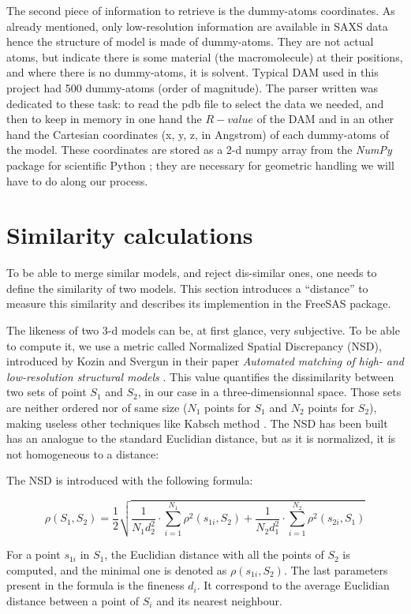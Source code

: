 \documentclass[a4paper, 11pt]{report}
\begin{document}
The second piece of information to retrieve is the dummy-atoms coordinates. 
As already mentioned, only low-resolution information are available in SAXS data 
hence the structure of model is made of dummy-atoms.
They are not actual atoms, but indicate there is 
some material (the macromolecule) at their positions, and where there is
no dummy-atoms, it is solvent. 
Typical DAM used in this project had 500 dummy-atoms (order of magnitude).
The parser written was dedicated to these task: to read the pdb file 
to select the data we needed, and then to keep in memory in one hand 
the $R-value$ of the DAM and in an other hand the Cartesian coordinates (x, y, 
z, in Angstrom) of each dummy-atoms of the model. 
These coordinates are stored as a 2-d numpy array from the 
\textit{NumPy} package for scientific Python \cite{numpy}; they are 
necessary for geometric handling we will have to do along our process.

\section{Similarity calculations}

To be able to merge similar models, and reject dis-similar ones,
one needs to define the similarity of two models. 
This section introduces a ``distance'' to measure this  
similarity and describes its implemention in the FreeSAS
package.

The likeness of two 3-d models can be, at first glance, very 
subjective. 
To be able to compute it, we use a metric called Normalized Spatial 
Discrepancy (NSD), introduced by Kozin and Svergun in their paper 
\textit{Automated matching of high- and low-resolution structural 
models} \cite{supcomb}. 
This value quantifies the dissimilarity between two sets of 
point $S_{1}$ and $S_{2}$, in our case in a three-dimensionnal space.
Those sets are neither ordered nor of same size ($N_{1}$ points for
$S_{1}$ and $N_{2}$ points for
$S_{2}$), making useless other techniques like Kabsch method
\cite{kabsch1976}.
The NSD has been built has an analogue to the standard Euclidian distance,
but as it is normalized, it is not homogeneous to a distance:

The NSD is introduced with the following formula:

\[
\rho(S_{1},S_{2})= \frac{1}{2} \sqrt {\frac{1}{N_{1}d_{2}^2} 
\cdot \sum\limits_{i=1}^{N_{1}} \rho^2(s_{1i}, S_{2}) + \frac{1}{N_{2}d_{1}^2} \cdot \sum\limits_{i=1}^{N_{2}} \rho^2(s_{2i}, S_{1})}
\]

For a point $s_{1i}$ in $S_{1}$, the Euclidian distance with all the 
points of $S_{2}$ is computed, and the minimal one is denoted as 
$\rho(s_{1i}, S_{2})$. 
The last parameters present in the formula is the fineness $d_{i}$. 
It correspond to the average Euclidian distance between a point of 
$S_{i}$ and its nearest neighbour.
\end{document}
